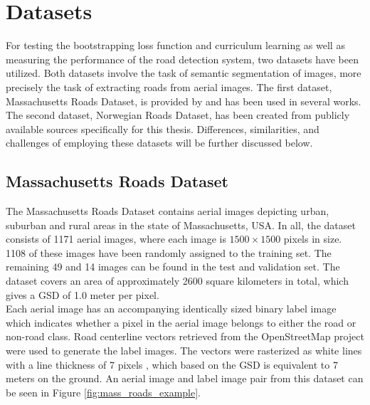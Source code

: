 \section{Datasets}
\label{sec:datasets}
For testing the bootstrapping loss function and curriculum learning as well as measuring the performance of the road detection system, two datasets have been utilized. Both datasets involve the task of semantic segmentation of images, more precisely the task of extracting roads from aerial images. The first dataset, Massachusetts Roads Dataset, is provided by \cite{MnihThesis} and has been used in several works. The second dataset, Norwegian Roads Dataset, has been created from publicly available sources specifically for this thesis. Differences, similarities, and challenges of employing these datasets will be further discussed below.\\

\subsection{Massachusetts Roads Dataset}
The Massachusetts Roads Dataset contains aerial images depicting urban, suburban and rural areas in the state of Massachusetts, USA. In all, the dataset consists of 1171 aerial images, where each image is $1500\times 1500$ pixels in size. 1108 of these images have been randomly assigned to the training set. The remaining 49 and 14 images can be found in the test and validation set. The dataset covers an area of approximately 2600 square kilometers in total, which gives a \ac{GSD} of 1.0 meter per pixel.\\

Each aerial image has an accompanying identically sized binary label image which indicates whether a pixel in the aerial image belongs to either the road or non-road class. Road centerline vectors retrieved from the OpenStreetMap project were used to generate the label images. The vectors were rasterized as white lines with a line thickness of 7 pixels \citep{MnihThesis}, which based on the \ac{GSD} is equivalent to 7 meters on the ground. An aerial image and label image pair from this dataset can be seen in Figure \ref{fig:mass_roads_example}.\\

